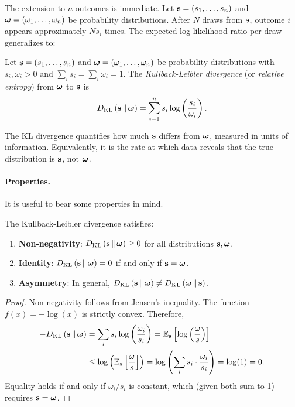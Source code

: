 The extension to $n$ outcomes is immediate. Let $\mathbf{s} = (s_1, \ldots, s_n)$ and $\boldsymbol{\omega} = (\omega_1, \ldots, \omega_n)$ be probability distributions. After $N$ draws from $\mathbf{s}$, outcome $i$ appears approximately $N s_i$ times. The expected log-likelihood ratio per draw generalizes to:

\begin{definition}
\label{def:kl-divergence}
Let $\mathbf{s} = (s_1, \ldots, s_n)$ and $\boldsymbol{\omega} = (\omega_1, \ldots, \omega_n)$ be probability distributions with $s_i, \omega_i > 0$ and $\sum_i s_i = \sum_i \omega_i = 1$. The \emph{Kullback-Leibler divergence} (or \emph{relative entropy}) from $\boldsymbol{\omega}$ to $\mathbf{s}$ is
\begin{equation}
\label{eq:kl-definition}
D_{\mathrm{KL}}\left(\mathbf{s} \,\|\, \boldsymbol{\omega}\right) = \sum_{i=1}^n s_i \log\left( \frac{s_i}{\omega_i} \right).
\end{equation}
\end{definition}

The KL divergence quantifies how much $\mathbf{s}$ differs from $\boldsymbol{\omega}$, measured in units of information. Equivalently, it is the rate at which data reveals that the true distribution is $\mathbf{s}$, not $\boldsymbol{\omega}$.

\paragraph{Properties.}
It is useful to bear some properties in mind. 

\begin{proposition}
\label{prop:kl-properties}
The Kullback-Leibler divergence satisfies:
\begin{enumerate}[leftmargin=2em]
    \item \textbf{Non-negativity}: $D_{\mathrm{KL}}\left(\mathbf{s} \,\|\, \boldsymbol{\omega}\right) \geq 0$ for all distributions $\mathbf{s}, \boldsymbol{\omega}$.
    \item \textbf{Identity}: $D_{\mathrm{KL}}\left(\mathbf{s} \,\|\, \boldsymbol{\omega}\right) = 0$ if and only if $\mathbf{s} = \boldsymbol{\omega}$.
    \item \textbf{Asymmetry}: In general, $D_{\mathrm{KL}}\left(\mathbf{s} \,\|\, \boldsymbol{\omega}\right) \neq D_{\mathrm{KL}}\left(\boldsymbol{\omega} \,\|\, \mathbf{s}\right)$.
\end{enumerate}
\end{proposition}

\begin{proof}
Non-negativity follows from Jensen's inequality. The function $f(x) = -\log(x)$ is strictly convex. Therefore,
\begin{align*}
-D_{\mathrm{KL}}\left(\mathbf{s} \,\|\, \boldsymbol{\omega}\right) &= \sum_i s_i \log\left( \frac{\omega_i}{s_i} \right) = \mathbb{E}_{\mathbf{s}}\left[ \log\left( \frac{\omega}{s} \right) \right] \\
&\leq \log\left( \mathbb{E}_{\mathbf{s}}\left[ \frac{\omega}{s} \right] \right) = \log\left( \sum_i s_i \cdot \frac{\omega_i}{s_i} \right) = \log(1) = 0.
\end{align*}
Equality holds if and only if $\omega_i/s_i$ is constant, which (given both sum to 1) requires $\mathbf{s} = \boldsymbol{\omega}$.
\end{proof}

